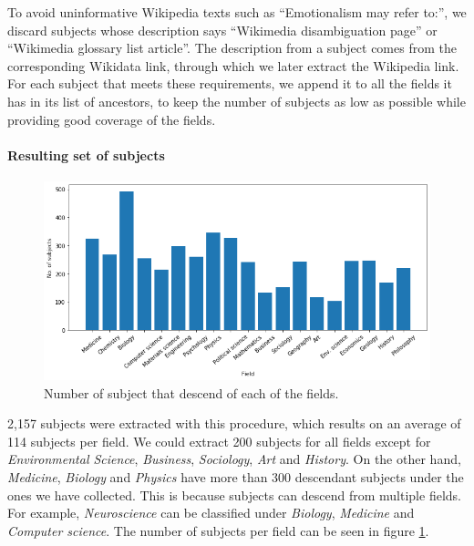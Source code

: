 To avoid uninformative Wikipedia texts such as ``Emotionalism may refer to:'', we discard subjects whose description says ``Wikimedia disambiguation page'' or ``Wikimedia glossary list article''. The description from a subject comes from the corresponding Wikidata link, through which we later extract the Wikipedia link. For each subject that meets these requirements, we append it to all the fields it has in its list of ancestors, to keep the number of subjects as low as possible while providing good coverage of the fields.

\paragraph{Resulting set of subjects} \mbox{} \label{problem_scope_subjects_result}

\begin{figure}
    \centering
    \includegraphics[width=\textwidth]{figures/unsupervised_approach/subjects_per_field.png}
    \caption{Number of subject that descend of each of the fields.}
    \label{fig:subjects_per_field}
\end{figure}

2,157 subjects were extracted with this procedure, which results on an average of 114 subjects per field. We could extract 200 subjects for all fields except for \textit{Environmental Science}, \textit{Business}, \textit{Sociology}, \textit{Art} and \textit{History}. On the other hand, \textit{Medicine}, \textit{Biology} and \textit{Physics} have more than 300 descendant subjects under the ones we have collected. This is because subjects can descend from multiple fields. For example, \textit{Neuroscience} can be classified under \textit{Biology}, \textit{Medicine} and \textit{Computer science}. The number of subjects per field can be seen in figure \ref{fig:subjects_per_field}.

